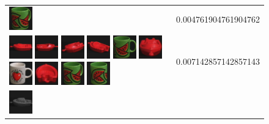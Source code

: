 \begin{figure}[!bp]
\begin{tabular}{m{11cm} | m{3cm} |}
\includegraphics[width=1cm]{coil/beeld-33.eps}
& {\scriptsize 0.004761904761904762}
\\
\includegraphics[width=1cm]{coil/beeld-18.eps}
\includegraphics[width=1cm]{coil/beeld-19.eps}
\includegraphics[width=1cm]{coil/beeld-21.eps}
\includegraphics[width=1cm]{coil/beeld-22.eps}
\includegraphics[width=1cm]{coil/beeld-30.eps}
\includegraphics[width=1cm]{coil/beeld-20.eps}
\includegraphics[width=1cm]{coil/beeld-36.eps}
\includegraphics[width=1cm]{coil/beeld-23.eps}
\includegraphics[width=1cm]{coil/beeld-33.eps}
\includegraphics[width=1cm]{coil/beeld-32.eps}
& {\scriptsize 0.007142857142857143}
\\
\includegraphics[width=1cm]{coil/beeld-24.eps}

\end{tabular}
\end{figure}
